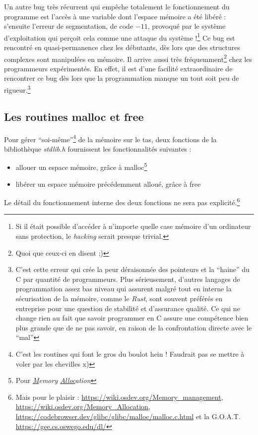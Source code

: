 \documentclass[../../../main.tex]{subfiles}
\begin{document}
Un autre bug très récurrent qui empêche totalement le fonctionnement du programme est l'accès à une variable dont l'espace mémoire a été libéré : s'ensuite l'erreur de segmentation, de code $-11$, provoqué par le système d'exploitation qui perçoit cela comme une attaque du système !\footnote{Si il était possible d'accéder à n'importe quelle case mémoire d'un ordinateur sans protection, le \textit{hacking} serait presque trivial.} Ce bug est rencontré en quasi-permanence chez les débutants, dès lors que des structures complexes sont manipulées en mémoire. Il arrive aussi très fréquemment\footnote{Quoi que ceux-ci en disent ;)} chez les programmeurs expérimentés. En effet, il est d'une facilité extraordinaire de rencontrer ce bug dès lors que la programmation manque un tout soit peu de rigueur.\footnote{C'est cette erreur qui crée la peur déraisonnée des pointeurs et la ``haine'' du C par quantité de programmeurs. Plus sérieusement, d'autres langages de programmation assez bas niveau qui assurent malgré tout en interne la sécurisation de la mémoire, comme le \textit{Rust}, sont souvent préférés en entreprise pour une question de stabilité et d'assurance qualité. Ce qui ne change rien au fait que savoir programmer en C assure une compétence bien plus grande que de ne pas savoir, en raison de la confrontation directe avec le ``mal''}
\subsection{Les routines \textsf{malloc} et \textsf{free}}
\label{sub:les_routines_malloc_et_free}
Pour gérer ``soi-même''\footnote{C'est les routines qui font le gros du boulot hein ! Faudrait pas se mettre à voler par les chevilles x)} de la mémoire sur le tas, deux fonctions de la bibliothèque \textit{stdlib.h} fournissent les fonctionnalités suivantes :
\begin{itemize}
	\item allouer un espace mémoire, grâce à \textsf{malloc}\footnote{Pour \textit{\underline{M}emory \underline{Alloc}ation}}
	\item libérer un espace mémoire précédemment alloué, grâce à \textsf{free}
\end{itemize}
Le détail du fonctionnement interne des deux fonctions ne sera pas explicité.\footnote{Mais pour le plaisir : \url{https://wiki.osdev.org/Memory_management}, \url{https://wiki.osdev.org/Memory_Allocation}, \url{https://codebrowser.dev/glibc/glibc/malloc/malloc.c.html} et la G.O.A.T. \url{https://gee.cs.oswego.edu/dl/}}
 
\end{document}
